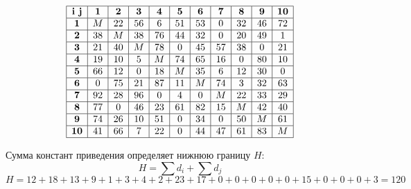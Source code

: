 \documentclass[17pt]{extarticle}
\begin{document}
\[
    \begin{array}{|c|c|c|c|c|c|c|c|c|c|c|}
        \hline
        \textbf{i j} & \textbf{1} & \textbf{2} & \textbf{3} & \textbf{4} & \textbf{5} & \textbf{6} & \textbf{7} & \textbf{8} & \textbf{9} & \textbf{10} \\
        \hline
        \textbf{1}   & M          & 22         & 56         & 6          & 51         & 53         & 0          & 32         & 46         & 72          \\
        \hline
        \textbf{2}   & 38         & M          & 38         & 76         & 44         & 32         & 0          & 20         & 49         & 1           \\
        \hline
        \textbf{3}   & 21         & 40         & M          & 78         & 0          & 45         & 57         & 38         & 0          & 21          \\
        \hline
        \textbf{4}   & 19         & 10         & 5          & M          & 74         & 65         & 16         & 0          & 80         & 10          \\
        \hline
        \textbf{5}   & 66         & 12         & 0          & 18         & M          & 35         & 6          & 12         & 30         & 0           \\
        \hline
        \textbf{6}   & 0          & 75         & 21         & 87         & 11         & M          & 74         & 3          & 32         & 63          \\
        \hline
        \textbf{7}   & 92         & 28         & 96         & 0          & 4          & 0          & M          & 22         & 33         & 29          \\
        \hline
        \textbf{8}   & 77         & 0          & 46         & 23         & 61         & 82         & 15         & M          & 42         & 40          \\
        \hline
        \textbf{9}   & 74         & 26         & 10         & 51         & 0          & 34         & 0          & 50         & M          & 61          \\
        \hline
        \textbf{10}  & 41         & 66         & 7          & 22         & 0          & 44         & 47         & 61         & 83         & M           \\
        \hline
    \end{array}
\]

Сумма констант приведения определяет нижнюю границу \( H \):
\[ H = \sum d_i + \sum d_j \]
\[ H = 12 + 18 + 13 + 9 + 1 + 3 + 4 + 2 + 23 + 17 + 0 + 0 + 0 + 0 + 0 + 15 + 0 + 0 + 0 + 3 = 120 \]
\end{document}
